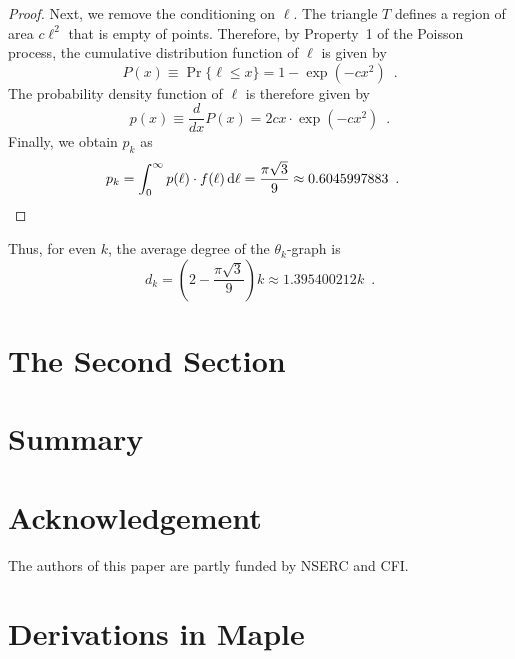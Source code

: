 \documentclass{patmorin}
\begin{document}
\begin{proof}
  Next, we remove the conditioning on $\ell$.  The triangle $T$ defines a
  region of area $c\ell^2$ that is empty of points.  Therefore,
  by Property~1 of the Poisson process, the cumulative distribution
  function of $\ell$ is given by
  \[
    P(x) \equiv \Pr\{\ell \le x\} = 1-\exp(-cx^2) \enspace .
  \]
  The probability density function of $\ell$ is therefore given by 
  \[
     p(x) \equiv \frac{d}{dx}P(x) =
     2cx\cdot\exp(-cx^2) \enspace .
  \]
  Finally, we obtain $p_k$ as 
  \begin{align*}
     p_k = \int_0^\infty p(\ell)\cdot f(\ell)\,\mathrm{d}\ell 
     = \frac{\pi\sqrt{3}}{9}
      \approx 0.6045997883  \enspace . & \qedhere
  \end{align*}
\end{proof}

Thus, for even $k$, the average degree of the $\theta_k$-graph is 
\[ d_k = \left(2-\frac{\pi\sqrt{3}}{9}\right)k \approx 1.395400212k \enspace . \]

\section{The Second Section}

\section{Summary}

\section*{Acknowledgement}

The authors of this paper are partly funded by NSERC and CFI.




\appendix

\section{Derivations in Maple}
\end{document}
